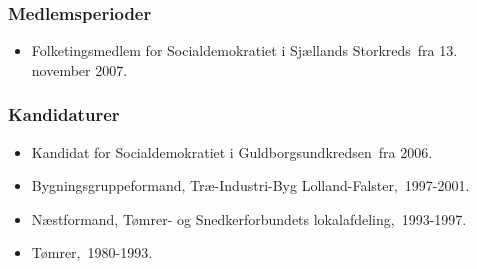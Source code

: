 \documentclass[11pt, a4paper]{awesome-cv}
\begin{document}
\begin{cvletter}
\subsubsection*{Medlemsperioder}
\begin{itemize}
\item Folketingsmedlem for Socialdemokratiet i Sjællands Storkreds fra 13. november 2007.
\end{itemize}
\subsubsection*{Kandidaturer}
\begin{itemize}
\item Kandidat for Socialdemokratiet i Guldborgsundkredsen fra 2006.
\end{itemize}
\begin{itemize}
\item Bygningsgruppeformand, Træ-Industri-Byg Lolland-Falster, 1997-2001.
\item Næstformand, Tømrer- og Snedkerforbundets lokalafdeling, 1993-1997.
\item Tømrer, 1980-1993.
\end{itemize}
\end{cvletter}
\end{document}
